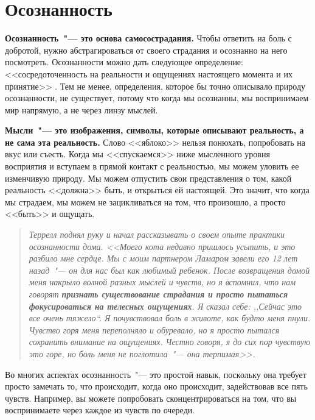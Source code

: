 
\chapter{Осознанность} \label{Mindfulness}

\textbf{Осознанность~"--- это основа самосострадания.} Чтобы ответить на боль с добротой, нужно абстрагироваться от своего страдания и осознанно на него посмотреть. Осознанности можно дать следующее определение: <<сосредоточенность на реальности и ощущениях настоящего момента и их принятие>> \cite{56}. Тем не менее, определения, которое бы точно описывало природу осознанности, не существует, потому что когда мы осознанны, мы воспринимаем мир напрямую, а не через линзу мыслей. 

\textbf{Мысли~"--- это изображения, символы, которые описывают реальность, а не сама эта реальность.} Слово <<яблоко>> нельзя понюхать, попробовать на вкус или съесть. Когда мы <<спускаемся>> ниже мысленного уровня восприятия и вступаем в прямой контакт с реальностью, мы можем уловить ее изменчивую природу. Мы можем отпустить свои представления о том, какой реальность <<должна>> быть, и открыться ей настоящей. Это значит, что когда мы страдаем, мы можем не зацикливаться на том, что произошло, а просто <<быть>> и ощущать. 

\begin{quotation}
	\textit{
		Террелл поднял руку и начал рассказывать о своем опыте практики осознанности дома. <<Моего кота недавно пришлось усыпить, и это разбило мне сердце. Мы с моим партнером Ламаром завели его 12 лет назад~"--- он для нас был как любимый ребенок. После возвращения домой меня накрыло волной разных мыслей и чувств, но я вспомнил, что нам говорят \textbf{признать существование страдания и просто пытаться фокусироваться на телесных ощущениях}. Я сказал себе: ,,Сейчас это все очень тяжело``. Я почувствовал боль в животе, как будто меня пнули. Чувство горя меня переполняло и обуревало, но я просто пытался сохранить внимание на ощущениях. Честно говоря, я до сих пор чувствую это горе, но боль меня не поглотила~"--- она терпимая>>.
	}
\end{quotation}

Во многих аспектах осознанность~"--- это простой навык, поскольку она требует просто замечать то, что происходит, когда оно происходит, задействовав все пять чувств. Например, вы можете попробовать сконцентрироваться на том, что вы воспринимаете через каждое из чувств по очереди.

